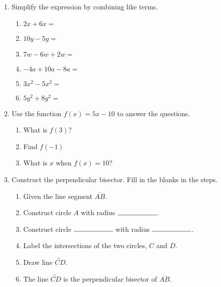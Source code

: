 \documentclass[12pt, twoside]{article}
\begin{document}
\begin{enumerate}[itemsep=0.5cm]
\item Simplify the expression by combining like terms.
    \begin{multicols}{2}
        \begin{enumerate}[itemsep=0.5cm]
            \item $2x + 6x =$
            \item $10y - 5y =$
            \item $7w - 6w + 2w =$
            \item $-4a + 10a - 8a =$
            \item $3x^2 - 5x^2 =$
            \item $5y^2 + 8y^2 =$
        \end{enumerate}
    \end{multicols}

\newpage
\item Use the function $f(x) = 5x-10$ to answer the questions.
\begin{multicols}{2}
\begin{enumerate}[itemsep=1cm]
    \item What is $f(3)$?
    \item Find $f(-1)$
    \item What is $x$ when $f(x) = 10$?
\end{enumerate}
\end{multicols} \vspace{1cm}

\item Construct the perpendicular bisector. Fill in the blanks in the steps.
\begin{enumerate}
  \item Given the line segment $\overline{AB}$.
  \bigskip
  \item Construct circle $A$ with radius $\rule{2cm}{0.15mm}$.
  \bigskip
  \item Construct circle $\rule{2cm}{0.15mm}$  with radius $\rule{2cm}{0.15mm}$.
  \item Label the intersections of the two circles, $C$ and $D$.
  \item Draw line $\overleftrightarrow{CD}$.
  \item The line $\overleftrightarrow{CD}$ is the perpendicular bisector of $\overline{AB}$.
\end{enumerate}
\vspace{5cm}
\begin{center}
\end{center}

\end{enumerate}
\end{document}
